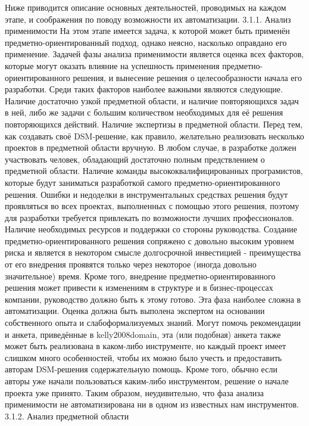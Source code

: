 	Ниже приводится описание основных деятельностей, проводимых на каждом этапе, и соображения по поводу возможности их автоматизации.
3.1.1. Анализ применимости
На этом этапе имеется задача, к которой может быть применён предметно-ориентированный подход, однако неясно, насколько оправдано его применение. Задачей фазы анализа применимости является оценка всех факторов, которые могут оказать влияние на успешность применения предметно-ориентированного решения, и вынесение решения о целесообразности начала его разработки. Среди таких факторов наиболее важными являются следующие.
Наличие достаточно узкой предметной области, и наличие повторяющихся задач в ней, либо же задачи с большим количеством необходимых для её решения повторяющихся действий.
Наличие экспертизы в предметной области.  Перед тем, как создавать своё DSM-решение, как правило, желательно реализовать несколько проектов в предметной области вручную. В любом случае, в разработке должен участвовать человек, обладающий достаточно полным предствлением о предметной области.
Наличие команды высококвалифицированных програмистов, которые будут заниматься разработкой самого предметно-ориентированного решения. Ошибки и недоделки в инструментальных средствах решения будут проявляться во всех проектах, выполненных с помощью этого решения, поэтому для разработки требуется привлекать по возможности лучших профессионалов.
Наличие необходимых ресурсов и поддержки со стороны руководства. Создание предметно-ориентированного решения сопряжено с довольно высоким уровнем риска и является в некотором смысле долгосрочной инвестицией - преимущества от его внедрения проявятся только через некоторое (иногда довольно значительное) время. Кроме того, внедрение предметно-ориентированного решения может привести к изменениям в структуре и в бизнес-процессах компании, руководство должно быть к этому готово.
	Эта фаза наиболее сложна в автоматизации. Оценка должна быть выполена экспертом на основании собственного опыта и слабоформализуемых знаний. Могут помочь рекомендации и анкета, приведённые в kelly2008domain, эта (или подобная) анкета также может быть реализована в каком-либо инструменте, но каждый проект имеет слишком много особенностей, чтобы их можно было учесть и предоставить авторам DSM-решения содержательную помощь. Кроме того, обычно если авторы уже начали пользоваться каким-либо инструментом, решение о начале проекта уже принято. Таким образом, неудивительно, что фаза анализа применимости не автоматизирована ни в одном из известных нам инструментов.
3.1.2. Анализ предметной области
